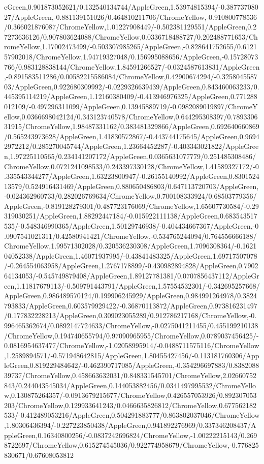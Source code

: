 {\begin{tikzternal}
eGreen,0.901873052621/0.132540134744/AppleGreen,1.53974815394/-0.38773708027/AppleGreen,-0.881139151026/0.464810211706/ChromeYellow,-0.910800778536/0.366021876087/ChromeYellow,1.01227908449/-0.502381129551/AppleGreen,0.27273636126/0.907803624088/ChromeYellow,0.0336718488727/0.202488771653/ChromeYellow,1.17002473499/-0.503307985265/AppleGreen,-0.828641752655/0.612157902018/ChromeYellow,1.94719327048/0.156995088656/AppleGreen,-0.15728073766/0.983128838144/ChromeYellow,1.84591266527/-0.0324587613831/AppleGreen,-0.891583511286/0.00582215586084/ChromeYellow,0.42900674294/-0.325804558703/AppleGreen,0.922680309992/-0.0229326639439/AppleGreen,0.843460063233/0.445395114219/AppleGreen,1.12160380409/-0.413946976325/AppleGreen,0.771288012109/-0.497296311099/AppleGreen,0.13945889719/-0.0982089019897/ChromeYellow,0.0366698042124/0.343123740578/ChromeYellow,0.644295308397/0.789330631915/ChromeYellow,1.98487331162/0.383481329866/AppleGreen,0.692640660869/0.565243973628/AppleGreen,1.41830572867/-0.443744175645/AppleGreen,0.96942972212/0.285270045744/AppleGreen,1.23664452287/-0.403343021822/AppleGreen,1.97225110565/0.234141207172/AppleGreen,0.0365631077779/0.251485308486/ChromeYellow,0.0721241098533/0.243397330128/ChromeYellow,1.41589327172/-0.335543344277/AppleGreen,1.63223800947/-0.26155140992/AppleGreen,0.830152413579/0.524916431469/AppleGreen,0.880650486803/0.647113720703/AppleGreen,-0.024362960733/0.282026769634/ChromeYellow,0.700108333924/0.68503779356/AppleGreen,-0.819128279301/0.487723176069/ChromeYellow,1.65607730584/-0.29319030251/AppleGreen,1.88292447184/-0.015922111138/AppleGreen,0.683543517535/-0.548346990365/AppleGreen,1.50129746938/-0.404434667367/AppleGreen,-0.0907541021311/0.42580941421/ChromeYellow,-0.534765244094/0.764556666188/ChromeYellow,1.99571302028/0.320536230308/AppleGreen,1.7096308364/-0.162104052338/AppleGreen,1.46071937995/-0.43841483325/AppleGreen,1.69717507078/-0.264554063958/AppleGreen,1.2767178899/-0.430982894828/AppleGreen,0.790264134053/-0.545749879408/AppleGreen,1.89127781381/0.0707856437112/AppleGreen,1.11817679113/-0.509791443791/AppleGreen,1.57554532301/-0.342695257668/AppleGreen,0.986489570124/0.199906245929/AppleGreen,0.984991264978/0.3824793833/AppleGreen,0.603579929422/-0.36870113872/AppleGreen,0.973816231497/0.177832228213/AppleGreen,0.309023055289/0.912786217168/ChromeYellow,-0.996465362674/0.0892147724633/ChromeYellow,-0.0275041211455/0.455199210138/ChromeYellow,0.194740655794/0.97090965955/ChromeYellow,0.0789037456425/-0.0816954637477/ChromeYellow,-1.02058995914/-0.0488711575116/ChromeYellow,1.2589894571/-0.571948642815/AppleGreen,1.80455427456/-0.113181760306/AppleGreen,0.819229484642/-0.462390717085/AppleGreen,-0.354296697883/0.838208839737/ChromeYellow,0.458663632031/0.848331545701/ChromeYellow,2.02660752843/0.244043545034/AppleGreen,0.144053882456/0.0341497995532/ChromeYellow,0.130875264357/-0.0913679215677/ChromeYellow,0.426557053926/0.892307053203/ChromeYellow,0.129933641243/0.0466635826812/ChromeYellow,0.677562182533/-0.412489053216/AppleGreen,0.504291883777/0.863802037046/ChromeYellow,1.80306436394/-0.227223850438/AppleGreen,0.941892276969/0.337346208437/AppleGreen,0.16340800256/-0.0837242696824/ChromeYellow,-1.00222215143/0.2698722697/ChromeYellow,0.615274545036/0.922774958679/ChromeYellow,-0.776825830671/0.67608053812
\end{tikzternal}}

